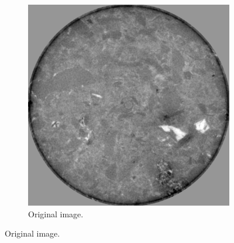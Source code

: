 \begin{figure}
  \begin{subfigure}[t]{\textwidth}
    \centering
    \includegraphics[width=.45\textwidth]{figures/shale/shale_ns/0.png}
    \caption{Original image. }
  \end{subfigure}

  \medskip


\end{figure}
